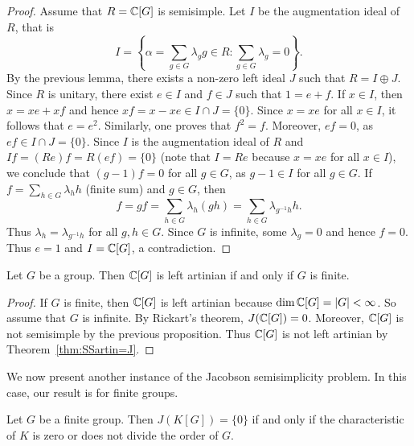 \begin{proof}
	Assume that $R=\mathbb{C}[G]$ is semisimple.  Let $I$ 
	be the augmentation ideal of $R$, that is
	\[
	I=\left\{\alpha=\sum_{g\in G}\lambda_gg\in R:\sum_{g\in G}\lambda_g=0\right\}.
	\]
	By the previous lemma, 
	there exists a non-zero left ideal $J$ such that 
	$R=I\oplus J$. Since $R$ is unitary, there exist $e\in I$ and $f\in J$ such that
	$1=e+f$. If
	$x\in I$, then $x=xe+xf$ and hence $xf=x-xe\in I\cap J=\{0\}$. Since 
	$x=xe$ for all $x\in I$, it follows that $e=e^2$. Similarly, one proves
	that $f^2=f$. Moreover, $ef=0$, as $ef\in I\cap J=\{0\}$.  Since $I$ 
	is the augmentation ideal of $R$ and $If=(Re)f=R(ef)=\{0\}$ 
 (note that $I=Re$ because $x=xe$ for all $x\in I$), we conclude that
	$(g-1)f=0$
	for all $g\in G$, as $g-1\in I$ for all $g\in G$. If $f=\sum_{h\in
	G}\lambda_hh$ (finite sum) and $g\in G$, then  
	\[
	f=gf=\sum_{h\in G}\lambda_h(gh)=\sum_{h\in
	G}\lambda_{g^{-1}h}h.
	\]
        Thus $\lambda_h=\lambda_{g^{-1}h}$ for all $g,h\in G$. Since $G$ 
	is infinite, some $\lambda_g=0$ and hence $f=0$. Thus $e=1$ and $I=\mathbb{C}[G]$, a contradiction. 
\end{proof}


\begin{theorem}
	Let $G$ be a group. Then $\mathbb{C}[G]$ 
	is left artinian if and only if 
	$G$ is finite. 
\end{theorem}

\begin{proof}
    If $G$ is finite, then $\mathbb{C}[G]$ is left artinian because $\dim\mathbb{C}[G]=|G|<\infty$. So assume that 
    $G$ is infinite. By Rickart's theorem,   
	$J(\mathbb{C}[G])=0$. Moreover, $\mathbb{C}[G]$
	is not semisimple by the previous proposition. Thus
	$\mathbb{C}[G]$ is not left artinian by Theorem~\ref{thm:SSartin=J}.
\end{proof}





We now present another instance of the Jacobson semisimplicity problem.
In this case, our result is for finite groups. 

\begin{theorem}[Maschke]
	Let $G$ be a finite group. Then $J(K[G])=\{0\}$ if and only 
	if the characteristic of $K$ is zero 
	or does not divide the order of $G$. 
\end{theorem}

